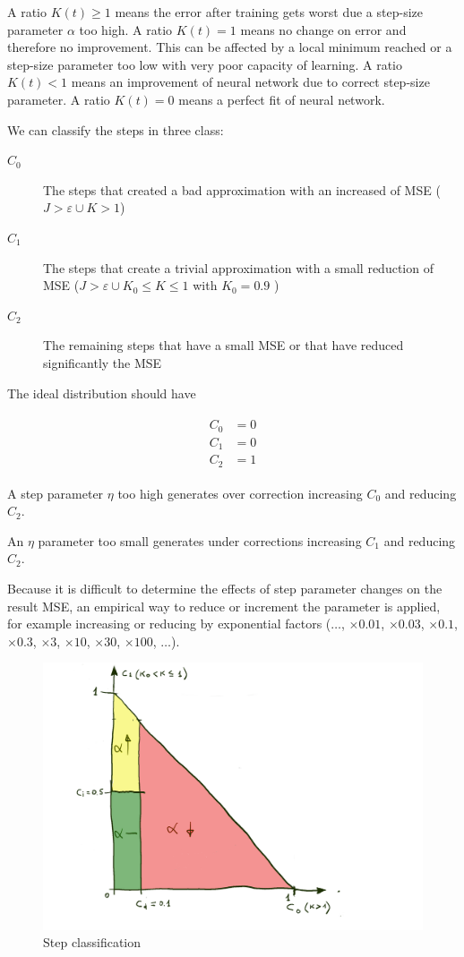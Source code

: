 \documentclass[]{article}
\begin{document}
A ratio $ K(t) \ge 1 $ means the error after training gets worst due a step-size parameter $ \alpha $ too high.
A ratio $ K(t) = 1 $  means no change on error and therefore no improvement. This can be affected by a local minimum reached or a step-size parameter too low with very poor capacity of learning.
A ratio $ K(t) < 1 $ means an improvement of neural network due to correct step-size parameter.
A ratio $ K(t) = 0 $ means a perfect fit of neural network.

We can classify the steps in three class:
\begin{description}

	\item[$ C_0 $]
	The steps that created a bad approximation with an increased of MSE ($ J > \varepsilon \cup K > 1$)

	\item[$ C_1 $]
	The steps that create a trivial approximation with a small reduction of MSE ($ J > \varepsilon \cup K_0 \le K \le 1 $ with $ K_0 = 0.9$ )

	\item[$ C_2 $]
	The remaining steps that have a small MSE or that have reduced significantly the MSE
\end{description}

The ideal distribution should have 

\begin{align}
\begin{split}
	C_0 & = 0
	\\
	C_1 & = 0
	\\
	C_2 & = 1
\end{split}
\end{align}

A step parameter $ \eta $ too high generates over correction increasing $ C_0 $ and reducing $ C_2 $.

An $ \eta $ parameter too small generates under corrections increasing $ C_1 $ and reducing $ C_2 $.

Because it is difficult to determine the effects of step parameter changes on the result MSE, an empirical way to reduce or increment the parameter is applied, for example increasing or reducing by exponential factors ($ \dots $, $ \times 0.01 $, $ \times 0.03 $, $ \times 0.1$, $\times 0.3 $, $ \times 3 $, $ \times 10 $, $ \times 30$, $\times 100 $, $ \dots $).

\begin{figure}[ht]
	\centering
	\includegraphics[width=\linewidth]{ann.png}
	\caption{Step classification}
	\label{fig:steps}
\end{figure}
\end{document}
